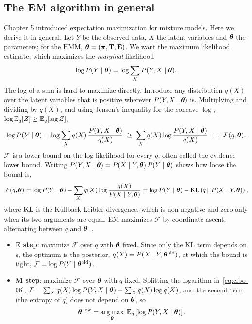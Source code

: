 \subsection{The EM algorithm in general}

Chapter 5 introduced expectation maximization for mixture models. Here we derive it in general. Let $Y$ be the observed data, $X$ the latent variables and $\boldsymbol{\theta}$ the parameters; for the HMM, $\boldsymbol{\theta}=(\boldsymbol{\pi},\mathbf{T},\mathbf{E})$. We want the maximum likelihood estimate, which maximizes the \emph{marginal} likelihood
\begin{equation}
  \log P(Y\mid\boldsymbol{\theta}) = \log\sum_X P(Y,X\mid\boldsymbol{\theta}).
\end{equation}
The log of a sum is hard to maximize directly. Introduce any distribution $q(X)$ over the latent variables that is positive wherever $P(Y,X\mid\boldsymbol{\theta})$ is. Multiplying and dividing by $q(X)$, and using Jensen's inequality for the concave $\log$, $\log\mathbb{E}_q[Z]\geq\mathbb{E}_q[\log Z]$,
\begin{equation}
  \log P(Y\mid\boldsymbol{\theta}) = \log\sum_X q(X)\,\frac{P(Y,X\mid\boldsymbol{\theta})}{q(X)} \;\geq\; \sum_X q(X)\log\frac{P(Y,X\mid\boldsymbol{\theta})}{q(X)} \;=:\; \mathcal{F}(q,\boldsymbol{\theta}).
  \label{eq:elbo-06}
\end{equation}
$\mathcal{F}$ is a lower bound on the log likelihood for every $q$, often called the evidence lower bound. Writing $P(Y,X\mid\boldsymbol{\theta})=P(X\mid Y,\boldsymbol{\theta})\,P(Y\mid\boldsymbol{\theta})$ shows how loose the bound is,
\begin{equation}
  \mathcal{F}(q,\boldsymbol{\theta}) = \log P(Y\mid\boldsymbol{\theta}) - \sum_X q(X)\log\frac{q(X)}{P(X\mid Y,\boldsymbol{\theta})} = \log P(Y\mid\boldsymbol{\theta}) - \mathrm{KL}\left(q\,\|\,P(X\mid Y,\boldsymbol{\theta})\right),
\end{equation}
where $\mathrm{KL}$ is the Kullback-Leibler divergence, which is non-negative and zero only when its two arguments are equal. EM maximizes $\mathcal{F}$ by coordinate ascent, alternating between $q$ and $\boldsymbol{\theta}$~\citep{dempster1977,neal1998}.
\begin{itemize}
  \item \textbf{E step}: maximize $\mathcal{F}$ over $q$ with $\boldsymbol{\theta}$ fixed. Since only the KL term depends on $q$, the optimum is the posterior, $q(X)=P(X\mid Y,\boldsymbol{\theta}^{\text{old}})$, at which the bound is tight, $\mathcal{F}=\log P(Y\mid\boldsymbol{\theta}^{\text{old}})$.
  \item \textbf{M step}: maximize $\mathcal{F}$ over $\boldsymbol{\theta}$ with $q$ fixed. Splitting the logarithm in~\eqref{eq:elbo-06}, $\mathcal{F}=\sum_X q(X)\log P(Y,X\mid\boldsymbol{\theta})-\sum_X q(X)\log q(X)$, and the second term (the entropy of $q$) does not depend on $\boldsymbol{\theta}$, so
  \begin{equation}
    \boldsymbol{\theta}^{\text{new}} = \operatorname*{arg\,max}_{\boldsymbol{\theta}}\;\mathbb{E}_{q}\left[\log P(Y,X\mid\boldsymbol{\theta})\right].
    \label{eq:mstep}
  \end{equation}
\end{itemize}
